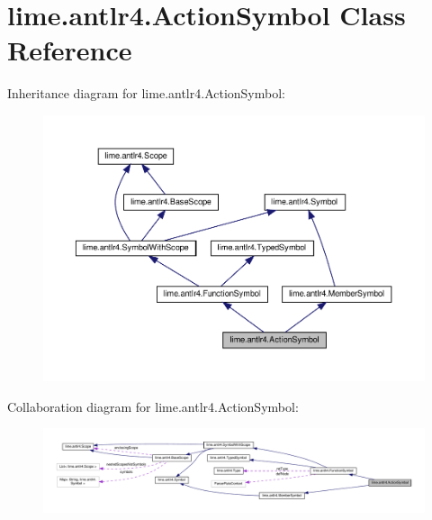 \hypertarget{classlime_1_1antlr4_1_1ActionSymbol}{}\section{lime.\+antlr4.\+Action\+Symbol Class Reference}
\label{classlime_1_1antlr4_1_1ActionSymbol}


Inheritance diagram for lime.\+antlr4.\+Action\+Symbol\+:
\nopagebreak
\begin{figure}[H]
\begin{center}
\leavevmode
\includegraphics[width=350pt]{classlime_1_1antlr4_1_1ActionSymbol__inherit__graph}
\end{center}
\end{figure}


Collaboration diagram for lime.\+antlr4.\+Action\+Symbol\+:
\nopagebreak
\begin{figure}[H]
\begin{center}
\leavevmode
\includegraphics[width=350pt]{classlime_1_1antlr4_1_1ActionSymbol__coll__graph}
\end{center}
\end{figure}
